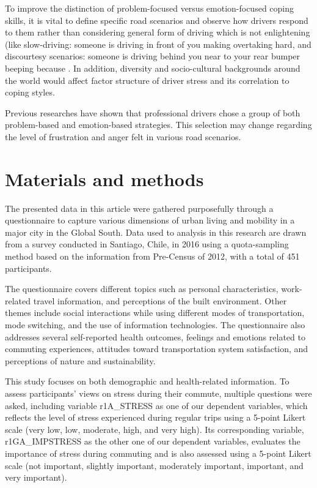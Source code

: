 \documentclass[
11pt, %
oneside, %
english, %
singlespacing, %
]{macthesis} %
\begin{document}
To improve the distinction of problem-focused versus emotion-focused coping skills, it is vital to define specific road scenarios and observe how drivers respond to them rather than considering general form of driving which is not enlightening (like slow-driving: someone is driving in front of you making overtaking hard, and discourtesy scenarios: someone is driving behind you near to your rear bumper beeping because . In addition, diversity and socio-cultural backgrounds around the world would affect factor structure of driver stress and its correlation to coping styles.

Previous researches have shown that professional drivers chose a group of both problem-based and emotion-based strategies. This selection may change regarding the level of frustration and anger felt in various road scenarios.

\hypertarget{materials-and-methods}{%
\section{Materials and methods}\label{materials-and-methods}}

The presented data in this article were gathered purposefully through a questionnaire to capture various dimensions of urban living and mobility in a major city in the Global South. Data used to analysis in this research are drawn from a survey conducted in Santiago, Chile, in 2016 using a quota-sampling method based on the information from Pre-Census of 2012, with a total of 451 participants.

The questionnaire covers different topics such as personal characteristics, work-related travel information, and perceptions of the built environment. Other themes include social interactions while using different modes of transportation, mode switching, and the use of information technologies. The questionnaire also addresses several self-reported health outcomes, feelings and emotions related to commuting experiences, attitudes toward transportation system satisfaction, and perceptions of nature and sustainability.

This study focuses on both demographic and health-related information. To assess participants' views on stress during their commute, multiple questions were asked, including variable r1A\_STRESS as one of our dependent variables, which reflects the level of stress experienced during regular trips using a 5-point Likert scale (very low, low, moderate, high, and very high). Its corresponding variable, r1GA\_IMPSTRESS as the other one of our dependent variables, evaluates the importance of stress during commuting and is also assessed using a 5-point Likert scale (not important, slightly important, moderately important, important, and very important).
\end{document}

